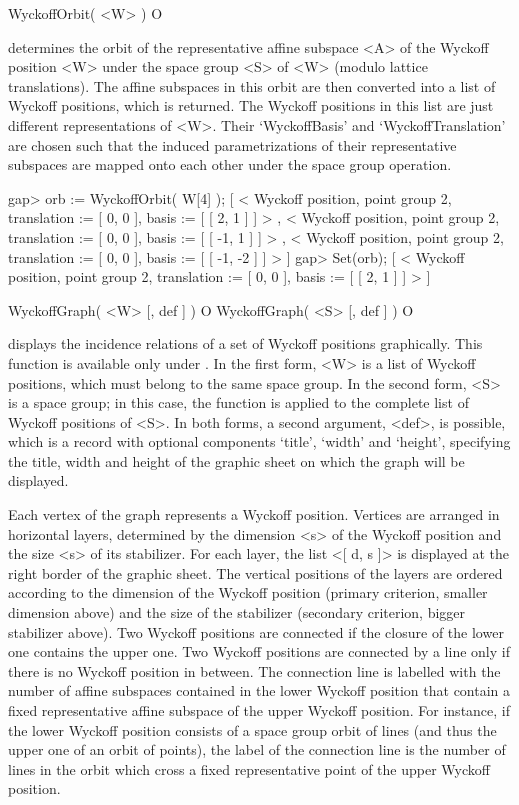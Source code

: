 \>WyckoffOrbit( <W> ) O

determines the orbit of the representative affine subspace <A> of the 
Wyckoff position <W> under the space group <S> of <W> (modulo lattice 
translations). The affine subspaces in this orbit are then converted 
into a list of Wyckoff positions, which is returned. The Wyckoff 
positions in this list are just different representations of <W>. 
Their `WyckoffBasis' and `WyckoffTranslation' are chosen such that 
the induced parametrizations of their representative subspaces are 
mapped onto each other under the space group operation.

\beginexample
gap> orb := WyckoffOrbit( W[4] );
[ < Wyckoff position, point group 2, translation := [ 0, 0 ], 
    basis := [ [ 2, 1 ] ] >
    , < Wyckoff position, point group 2, translation := [ 0, 0 ], 
    basis := [ [ -1, 1 ] ] >
    , < Wyckoff position, point group 2, translation := [ 0, 0 ], 
    basis := [ [ -1, -2 ] ] >
     ]
gap> Set(orb);
[ < Wyckoff position, point group 2, translation := [ 0, 0 ], 
    basis := [ [ 2, 1 ] ] >
     ]
\endexample

\>WyckoffGraph( <W> [, def ] ) O
\>WyckoffGraph( <S> [, def ] ) O

displays the incidence relations of a set of Wyckoff positions graphically.
This function is available only under {\XGAP}. In the first form, <W> is
a list of Wyckoff positions, which must belong to the same space group.
In the second form, <S> is a space group; in this case, the function is
applied to the complete list of Wyckoff positions of <S>. In both forms,
a second argument, <def>, is possible, which is a record with optional
components `title', `width' and `height', specifying the title, width
and height of the graphic sheet on which the graph will be displayed.

Each vertex of the graph represents a Wyckoff position. Vertices are
arranged in horizontal layers, determined by the dimension <s> of the 
Wyckoff position and the size <s> of its stabilizer. For each layer, 
the list <[ d, s ]> is displayed at the right border of the graphic 
sheet. The vertical positions of the layers are ordered according to 
the dimension of the Wyckoff position (primary criterion, smaller 
dimension above) and the size of the stabilizer (secondary criterion, 
bigger stabilizer above). Two Wyckoff positions are connected if the 
closure of the lower one contains the upper one. Two Wyckoff positions
are connected by a line only if there is no Wyckoff position in between. 
The connection line is labelled with the number of affine subspaces 
contained in the lower Wyckoff position that contain a fixed 
representative affine subspace of the upper Wyckoff position.
For instance, if the lower Wyckoff position consists of a space
group orbit of lines (and thus the upper one of an orbit of points), 
the label of the connection line is the number of lines in the orbit 
which cross a fixed representative point of the upper Wyckoff position.

